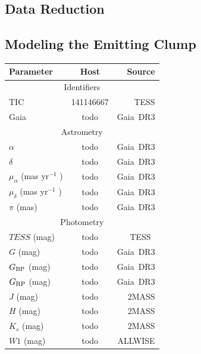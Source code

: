 \documentclass{nature3}
\begin{document}
\begin{methods}
\subsection{Data Reduction}

\subsection{Modeling the Emitting Clump}




%
\begin{table}
    \centering
    \begin{tabular}{lcr}
    \hline 
    \hline
    Parameter & Host & Source \\
    \hline 
    \multicolumn{3}{c}{Identifiers} \\
    \hline
    TIC & 141146667 & TESS \\
    Gaia & todo & Gaia\ DR3 \\
    \hline
    \multicolumn{3}{c}{Astrometry} \\ 
    \hline
    $\alpha$ & todo & Gaia\ DR3 \\
    $\delta$ & todo & Gaia\ DR3 \\
    $\mu_{\alpha}$ (mas yr$^{-1}$ ) & todo & Gaia\ DR3 \\
    $\mu_{\delta}$ (mas yr$^{-1}$ ) & todo & Gaia\ DR3 \\
    $\pi$ (mas) & todo & Gaia\ DR3 \\
    \hline
    \multicolumn{3}{c}{Photometry} \\
    \hline
    $TESS$ (mag) & todo & TESS\ \\
    $G$ (mag) & todo & Gaia\ DR3 \\
    $G_{\rm BP}$ (mag) & todo & Gaia\ DR3\\
    $G_{\rm RP}$ (mag) & todo & Gaia\ DR3\\
    $J$ (mag) & todo & 2MASS\\
    $H$ (mag) & todo & 2MASS\\
    $K_s$ (mag) & todo & 2MASS\\
    $W1$ (mag) & todo & ALLWISE \\

\end{tabular}
\end{table}
\end{methods}
\end{document}
